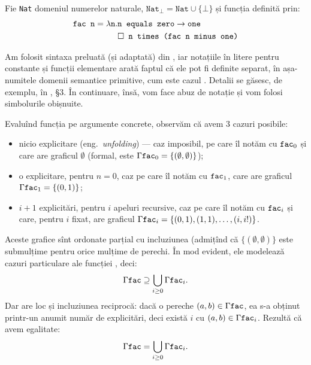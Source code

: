 \documentclass[12pt, a4paper]{article}
\begin{document}
Fie \texttt{Nat} domeniul numerelor naturale,
$\texttt{Nat}_\perp = \texttt{Nat} \cup \{ \bot \} $ și funcția definită prin:
\begin{align*}
  \texttt{fac n} = \lambda \texttt{n}.&\texttt{n equals zero} \to \texttt{one} \\
               &\square \texttt{ n times (fac n minus one)}
\end{align*}

Am folosit sintaxa preluată (și adaptată) din \cite{schm}, iar notațiile
în litere pentru constante și funcții elementare arată faptul că ele pot fi
definite separat, în așa-numitele domenii semantice primitive, cum este cazul
. Detalii se găsesc, de exemplu, în \cite{schm}, \S 3. În continuare,
însă, vom face abuz de notație și vom folosi simbolurile obișnuite.

Evaluînd funcția  pe argumente concrete, observăm că avem 3 cazuri posibile:
\begin{itemize}
\item nicio explicitare (eng.\ \emph{unfolding}) --- caz imposibil, pe care îl notăm
  cu $ \texttt{fac}_0 $ și care are graficul $ \emptyset $ (formal, este
  $ \Gamma \texttt{fac}_0 = \{ (\emptyset, \emptyset) \} $);
\item o explicitare, pentru $ n = 0 $, caz pe care îl notăm cu $ \texttt{fac}_1 $, care are
  graficul $ \Gamma \texttt{fac}_1 = \{ (0, 1) \} $;
\item $ i + 1 $ explicitări, pentru $ i $ apeluri recursive, caz pe care îl notăm cu
  $ \texttt{fac}_i $ și care, pentru $ i $ fixat, are graficul
  $ \Gamma \texttt{fac}_i = \{ (0, 1), (1, 1), \dots, (i, i!) \} $.
\end{itemize}

Aceste grafice sînt ordonate parțial cu incluziunea (admițînd că $ \{ (\emptyset, \emptyset) \} $
este submulțime pentru orice mulțime de perechi. În mod evident, ele modelează cazuri
particulare ale funcției , deci:
\[
  \Gamma \texttt{fac} \supseteq \bigcup_{i \geq 0} \Gamma \texttt{fac}_i.
\]
Dar are loc și incluziunea reciprocă: dacă o pereche $ (a, b) \in \Gamma \texttt{fac} $, ea
s-a obținut printr-un anumit număr de explicitări, deci există $ i $ cu $ (a, b) \in \Gamma \texttt{fac}_i $.
Rezultă că avem egalitate:
\[
  \Gamma \texttt{fac} = \bigcup_{i \geq 0} \Gamma \texttt{fac}_i.
\]
\end{document}
